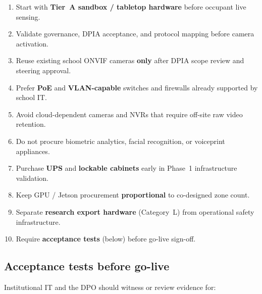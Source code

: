 \begin{enumerate}[noitemsep]
  \item Start with \textbf{Tier~A sandbox / tabletop hardware} before occupant live sensing.
  \item Validate governance, DPIA acceptance, and protocol mapping before camera activation.
  \item Reuse existing school ONVIF cameras \textbf{only} after DPIA scope review and steering approval.
  \item Prefer \textbf{PoE} and \textbf{VLAN-capable} switches and firewalls already supported by school IT.
  \item Avoid cloud-dependent cameras and NVRs that require off-site raw video retention.
  \item Do not procure biometric analytics, facial recognition, or voiceprint appliances.
  \item Purchase \textbf{UPS} and \textbf{lockable cabinets} early in Phase~1 infrastructure validation.
  \item Keep GPU / Jetson procurement \textbf{proportional} to co-designed zone count.
  \item Separate \textbf{research export hardware} (Category~L) from operational safety infrastructure.
  \item Require \textbf{acceptance tests} (below) before go-live sign-off.
\end{enumerate}

\subsection{Acceptance tests before go-live}

Institutional IT and the DPO should witness or review evidence for:

